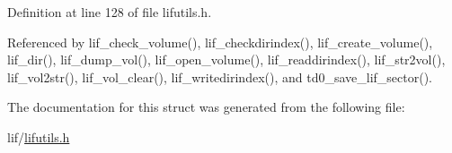 Definition at line 128 of file lifutils.\+h.



Referenced by lif\+\_\+check\+\_\+volume(), lif\+\_\+checkdirindex(), lif\+\_\+create\+\_\+volume(), lif\+\_\+dir(), lif\+\_\+dump\+\_\+vol(), lif\+\_\+open\+\_\+volume(), lif\+\_\+readdirindex(), lif\+\_\+str2vol(), lif\+\_\+vol2str(), lif\+\_\+vol\+\_\+clear(), lif\+\_\+writedirindex(), and td0\+\_\+save\+\_\+lif\+\_\+sector().



The documentation for this struct was generated from the following file\+:\begin{DoxyCompactItemize}
\item 
lif/\hyperlink{lifutils_8h}{lifutils.\+h}\end{DoxyCompactItemize}
